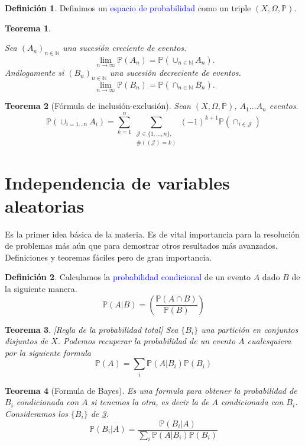 \documentclass[11pt]{article}
\theoremstyle{plain} %
\newtheorem{teorema}{Teorema}
\theoremstyle{definition}
\newtheorem*{definicion}{Definici\'{o}n} %
\theoremstyle{remark}
\def\Om{\Omega}
\def\N{\mathbb{N}}
\def\P{\mathbb{P}}
\def\blue{\textcolor{blue}}
\begin{document}
\begin{definicion}
	Definimos un \blue{espacio de probabilidad} como un triple $\left( X,\Om,\mathbb P\right) $. 
\end{definicion}


\begin{teorema}
	\label{teo:contproba}
	
	Sea $(A_n)_{n \in \N}$ una sucesi\'on creciente de eventos.
	\[ \ \lim_{n \to \infty} \P(A_n) = \P(\cup_{n \in \N} A_n). \]
	An\'alogamente si $(B_n)_{n \in \N}$ una sucesi\'on decreciente de eventos.
	\[ \ \lim_{n \to \infty} \P(B_n) = \P(\cap_{n \in \N} B_n). \]
\end{teorema}

\begin{teorema}
	[F\'ormula de inclusi\'on-exclusi\'on]
	Sean $\left( X,\Om,\mathbb P\right) $, $A_1 \dots A_n$ eventos.
	\begin{equation*}
		\P \left( \cup_{i=1 \dots n} A_{i}\right)  = \sum_{k=1}^{n} \sum_{\substack{\mathcal{J}\in \{1,\dots,n\},\\\#(\mathcal{(J)} = k)}}	\left(-1 \right)^{k+1} \P\left( \cap_{i \in \mathcal J} \right)  		
	\end{equation*}
\end{teorema}
\bigskip
\section{Independencia de variables aleatorias}

Es la primer idea básica de la materia. Es de vital importancia para la resolución de problemas más aún que para demostrar otros resultados más avanzados. Definiciones y teoremas fáciles pero de gran importancia.

\begin{definicion}
	Calculamos la \blue{probabilidad condicional} de un evento $A$ dado $B$ de la siguiente manera.
	\[\P(A|B) = \left(\dfrac{\P(A\cap B)}{\P(B)} \right) \]
\end{definicion}

\begin{teorema}
	\label{teo:total}
	[Regla de la probabilidad total]
	Sea $\{B_i\}$ una partici\'on  en conjuntos disjuntos de $X$. Podemos recuperar la probabilidad de un evento $A$ cualesquiera por la siguiente formula
	\[ \P(A) = \sum_{i}\P(A|B_i)\P(B_i)\]
\end{teorema}

\begin{teorema}
	[Formula de Bayes]
	Es una formula para obtener la probabilidad de $B_i$ condicionada con $A$ si tenemos la otra, es decir la de $A$ condicionada con $B_i$. Consideramos los $\{B_i\}$ de \ref{teo:total}.
	\[\P(B_i|A) = \dfrac{\P(B_i|A)}{\sum_{i}\P(A|B_i)\P(B_i)}\]
\end{teorema}
\end{document}
